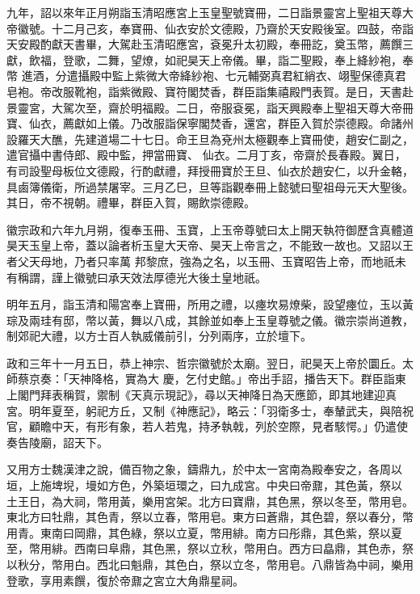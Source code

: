 \begin{pinyinscope}
 九年，詔以來年正月朔詣玉清昭應宮上玉皇聖號寶冊，二日詣景靈宮上聖祖天尊大帝徽號。十二月己亥，奉寶冊、仙衣安於文德殿，乃齋於天安殿後室。四鼓，帝詣天安殿酌獻天書畢，大駕赴玉清昭應宮，袞冕升太初殿，奉冊訖，奠玉幣，薦饌三獻，飲福，登歌，二舞，望燎，如祀昊天上帝儀。畢，詣二聖殿，奉上絳紗袍，奉幣
 進酒，分遣攝殿中監上紫微大帝絳紗袍、七元輔弼真君紅綃衣、翊聖保德真君皂袍。帝改服靴袍，詣紫微殿、寶符閣焚香，群臣詣集禧殿門表賀。是日，天書赴景靈宮，大駕次至，齋於明福殿。二日，帝服袞冕，詣天興殿奉上聖祖天尊大帝冊寶、仙衣，薦獻如上儀。乃改服詣保寧閣焚香，還宮，群臣入賀於崇德殿。命諸州設羅天大醮，先建道場二十七日。命王旦為兗州太極觀奉上寶冊使，趙安仁副之，遣官攝中書侍郎、殿中監，押當冊寶、
 仙衣。二月丁亥，帝齋於長春殿。翼日，有司設聖母板位文德殿，行酌獻禮，拜授冊寶於王旦、仙衣於趙安仁，以升金輅，具鹵簿儀衛，所過禁屠宰。三月乙巳，旦等詣觀奉冊上懿號曰聖祖母元天大聖後。其日，帝不視朝。禮畢，群臣入賀，賜飲崇德殿。



 徽宗政和六年九月朔，復奉玉冊、玉寶，上玉帝尊號曰太上開天執符御歷含真體道昊天玉皇上帝，蓋以論者析玉皇大天帝、昊天上帝言之，不能致一故也。又詔以王者父天母地，乃者只率萬
 邦黎庶，強為之名，以玉冊、玉寶昭告上帝，而地祇未有稱謂，謹上徽號曰承天效法厚德光大後土皇地祇。



 明年五月，詣玉清和陽宮奉上寶冊，所用之禮，以瘞坎易燎柴，設望瘞位，玉以黃琮及兩珪有邸，幣以黃，舞以八成，其餘並如奉上玉皇尊號之儀。徽宗崇尚道教，制郊祀大禮，以方士百人執威儀前引，分列兩序，立於壇下。



 政和三年十一月五日，恭上神宗、哲宗徽號於太廟。翌日，祀昊天上帝於圜丘。太師蔡京奏：「天神降格，實為大
 慶，乞付史館。」帝出手詔，播告天下。群臣詣東上閣門拜表稱賀，禦制《天真示現記》，尋以天神降日為天應節，即其地建迎真宮。明年夏至，躬祀方丘，又制《神應記》，略云：「羽衛多士，奉輦武夫，與陪祝官，顧瞻中天，有形有象，若人若鬼，持矛執戟，列於空際，見者駭愕。」仍遣使奏告陵廟，詔天下。



 又用方士魏漢津之說，備百物之象，鑄鼎九，於中太一宮南為殿奉安之，各周以垣，上施埤堄，墁如方色，外築垣環之，曰九成宮。中央曰帝鼐，其色黃，祭以
 土王日，為大祠，幣用黃，樂用宮架。北方曰寶鼎，其色黑，祭以冬至，幣用皂。東北方曰牡鼎，其色青，祭以立春，幣用皂。東方曰蒼鼎，其色碧，祭以春分，幣用青。東南曰岡鼎，其色綠，祭以立夏，幣用緋。南方曰彤鼎，其色紫，祭以夏至，幣用緋。西南曰阜鼎，其色黑，祭以立秋，幣用白。西方曰皛鼎，其色赤，祭以秋分，幣用白。西北曰魁鼎，其色白，祭以立冬，幣用皂。八鼎皆為中祠，樂用登歌，享用素饌，復於帝鼐之宮立大角鼎星祠。




\end{pinyinscope}
